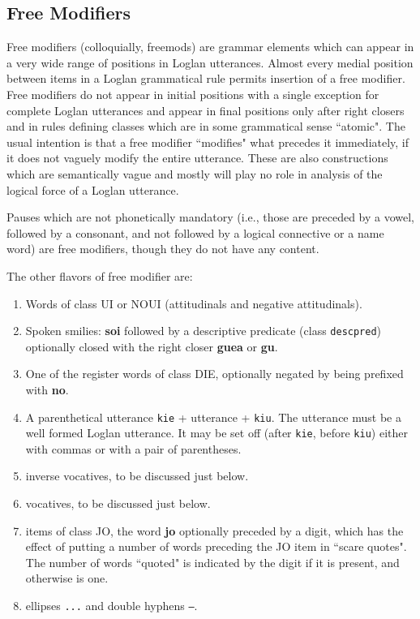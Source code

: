 \documentclass[12pt]{book}
\begin{document}
\subsection{Free Modifiers}

Free modifiers (colloquially, freemods) are grammar elements which can appear in a very wide range of positions in Loglan utterances.  Almost every medial position between items in a Loglan grammatical rule permits insertion of a free modifier.  Free modifiers do not appear in initial positions with a single exception for
complete Loglan utterances and appear in final positions only after right closers and in rules defining classes which are in some grammatical sense ``atomic".  The usual intention is that a free modifier ``modifies" what precedes it immediately, if it does not vaguely modify the entire utterance.  These are also constructions which are semantically vague and mostly will play no role in analysis of the logical force of a Loglan utterance.

Pauses which are not phonetically mandatory (i.e., those are preceded by a vowel, followed by a consonant, and not followed by a logical connective or a name word) are free modifiers, though they do not have any content.

The other flavors of free modifier are:

\begin{enumerate}

\item  Words of class UI or NOUI (attitudinals and negative attitudinals).

\item  Spoken smilies:  {\bf soi} followed by a descriptive predicate (class {\tt descpred}) optionally closed with the right closer {\bf guea} or {\bf gu}.

\item  One of the register words of class DIE, optionally negated by being prefixed with {\bf no}.

\item  A parenthetical utterance {\tt kie} + utterance + {\tt kiu}.  The utterance must be a well formed Loglan utterance.  It may be set off (after {\tt kie}, before {\tt kiu}) either with commas or with a pair of parentheses.

\item inverse vocatives, to be discussed just below.

\item  vocatives, to be discussed just below.

\item  items of class JO, the word {\bf jo} optionally preceded by a digit, which has the effect of putting a number of words preceding the JO item in ``scare quotes".  The number of words ``quoted" is indicated by the digit if it is present, and otherwise is one.

\item ellipses {\tt ...} and double hyphens {\tt --}.

\end{enumerate}
\end{document}
